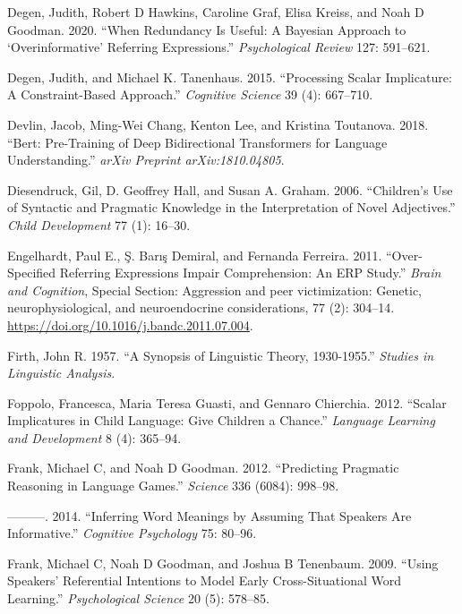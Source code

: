 \documentclass{ucetd}
\newlength{\cslhangindent}
\newenvironment{cslreferences}%
{\setlength{\parindent}{0pt}%
\everypar{\setlength{\hangindent}{\cslhangindent}}\ignorespaces}%
{\par}
\begin{document}
\begin{cslreferences}
\leavevmode\hypertarget{ref-degen_when_2020}{}%
Degen, Judith, Robert D Hawkins, Caroline Graf, Elisa Kreiss, and Noah D
Goodman. 2020. ``When Redundancy Is Useful: A Bayesian Approach to
`Overinformative' Referring Expressions.'' \emph{Psychological Review}
127: 591--621.

\leavevmode\hypertarget{ref-degen_processing_2015}{}%
Degen, Judith, and Michael K. Tanenhaus. 2015. ``Processing Scalar
Implicature: A Constraint-Based Approach.'' \emph{Cognitive Science} 39
(4): 667--710.

\leavevmode\hypertarget{ref-devlin2018}{}%
Devlin, Jacob, Ming-Wei Chang, Kenton Lee, and Kristina Toutanova. 2018.
``Bert: Pre-Training of Deep Bidirectional Transformers for Language
Understanding.'' \emph{arXiv Preprint arXiv:1810.04805}.

\leavevmode\hypertarget{ref-diesendruck_childrens_2006}{}%
Diesendruck, Gil, D. Geoffrey Hall, and Susan A. Graham. 2006.
``Children's Use of Syntactic and Pragmatic Knowledge in the
Interpretation of Novel Adjectives.'' \emph{Child Development} 77 (1):
16--30.

\leavevmode\hypertarget{ref-engelhardt_over-specified_2011}{}%
Engelhardt, Paul E., Ş. Barış Demiral, and Fernanda Ferreira. 2011.
``Over-Specified Referring Expressions Impair Comprehension: An ERP
Study.'' \emph{Brain and Cognition}, Special Section: Aggression and
peer victimization: Genetic, neurophysiological, and neuroendocrine
considerations, 77 (2): 304--14.
\url{https://doi.org/10.1016/j.bandc.2011.07.004}.

\leavevmode\hypertarget{ref-firth1957}{}%
Firth, John R. 1957. ``A Synopsis of Linguistic Theory, 1930-1955.''
\emph{Studies in Linguistic Analysis}.

\leavevmode\hypertarget{ref-foppolo_scalar_2012}{}%
Foppolo, Francesca, Maria Teresa Guasti, and Gennaro Chierchia. 2012.
``Scalar Implicatures in Child Language: Give Children a Chance.''
\emph{Language Learning and Development} 8 (4): 365--94.

\leavevmode\hypertarget{ref-frank2012}{}%
Frank, Michael C, and Noah D Goodman. 2012. ``Predicting Pragmatic
Reasoning in Language Games.'' \emph{Science} 336 (6084): 998--98.

\leavevmode\hypertarget{ref-frank2014}{}%
---------. 2014. ``Inferring Word Meanings by Assuming That Speakers Are
Informative.'' \emph{Cognitive Psychology} 75: 80--96.

\leavevmode\hypertarget{ref-frank2009}{}%
Frank, Michael C, Noah D Goodman, and Joshua B Tenenbaum. 2009. ``Using
Speakers' Referential Intentions to Model Early Cross-Situational Word
Learning.'' \emph{Psychological Science} 20 (5): 578--85.


\end{cslreferences}
\end{document}
